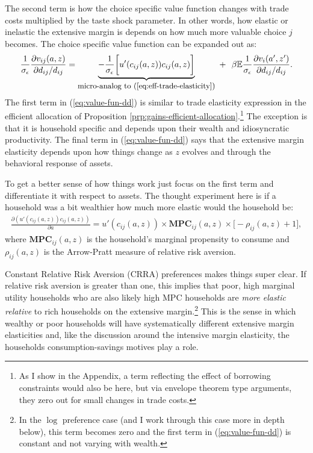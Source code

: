 \documentclass[12pt,pdftex]{article}
\begin{document}
\begin{onehalfspacing}
The second term is how the choice specific value function changes with trade costs multiplied by the taste shock parameter. In other words, how elastic or inelastic the extensive margin is depends on how much more valuable choice $j$ becomes. The choice specific value function can be expanded out as:
\begin{align}
\frac{1}{\sigma_{\epsilon}}\frac{\partial v_{ij}(a,z)}{\partial d_{ij}/d_{ij}} = \underbrace{-\frac{1}{\sigma_{\epsilon}}\bigg[u'(c_{ij}(a,z))c_{ij}(a,z)\bigg]}_{\mbox{\small micro-analog to (\ref{eq:eff-trade-elasticity})}} \
+ \ \ \beta \mathbb{E}\frac{1}{\sigma_{\epsilon}}\frac{\partial v_{i}(a',z')}{\partial d_{ij}/ d_{ij}}. \label{eq:value-fun-dd}
\end{align}
The first term in (\ref{eq:value-fun-dd}) is similar to trade elasticity expression in the efficient allocation of Proposition \ref{prp:gains-efficient-allocation}.\footnote{\label{f-note:bc-elasticity} As I show in the Appendix, a term reflecting the effect of borrowing constraints would also be here, but via envelope theorem type arguments, they zero out for small changes in trade costs.} The exception is that it is household specific and depends upon their wealth and idiosyncratic productivity. The final term in (\ref{eq:value-fun-dd}) says that the extensive margin elasticity depends upon how things change as $z$ evolves and through the behavioral response of assets.

To get a better sense of how things work just focus on the first term and differentiate it with respect to assets. The thought experiment here is if a household was a bit wealthier how much more elastic would the household be:
\begin{align}
\frac{\partial (u'(c_{ij}(a,z))c_{ij}(a,z))}{\partial a} = u'(c_{ij}(a,z))\times \mathbf{MPC}_{ij}(a,z) \times \bigg[-\rho_{ij}(a,z) + 1\bigg], \label{eq:elasticity-mpc}
\end{align}
where $\mathbf{MPC}_{ij}(a,z)$ is the household's marginal propensity to consume and $\rho_{ij}(a,z)$ is the Arrow-Pratt measure of relative risk aversion.

Constant Relative Risk Aversion (CRRA) preferences makes things super clear. If relative risk aversion is greater than one, this implies that poor, high marginal utility households who are also likely high MPC households are\emph{ more elastic relative} to rich households on the extensive margin.\footnote{In the $\log$ preference case (and I work through this case more in depth below), this term becomes zero and the first term in (\ref{eq:value-fun-dd}) is constant and not varying with wealth.} This is the sense in which wealthy or poor households will have systematically different extensive margin elasticities and, like the discussion around the intensive margin elasticity, the households consumption-savings motives play a role.


\end{onehalfspacing}
\end{document}
